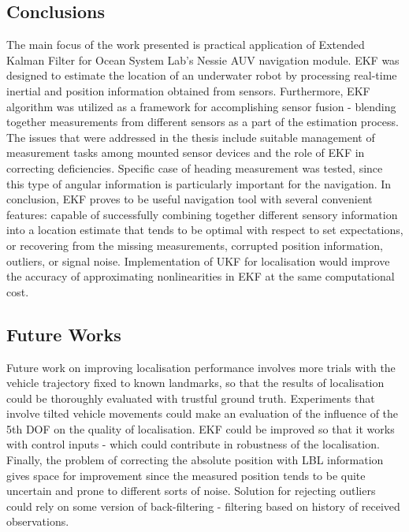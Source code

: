 \documentclass[a4paper, 10pt, conference]{ieeeconf}        %
\begin{document}
\subsection{Conclusions}
The main focus of the work presented is practical application of Extended Kalman Filter for Ocean System Lab's Nessie AUV navigation module. EKF was designed to estimate the location of an underwater robot by processing real-time inertial and position information obtained from sensors. Furthermore, EKF algorithm was utilized as a framework for accomplishing sensor fusion - blending together measurements from different sensors as a part of the estimation process. The issues that were addressed in the thesis include suitable management of measurement tasks among mounted sensor devices and the role of EKF in correcting deficiencies. Specific case of heading measurement was tested, since this type of angular information is particularly important for the navigation. In conclusion, EKF proves to be useful navigation tool with several convenient features: capable of successfully combining together different sensory information into a location estimate that tends to be optimal with respect to set expectations, or recovering from the missing measurements, corrupted position information, outliers, or signal noise. Implementation of UKF for localisation would improve the accuracy of approximating nonlinearities in EKF at the same computational cost.
\subsection{Future Works}
Future work on improving localisation performance involves more trials with the vehicle trajectory fixed to known landmarks, so that the results of localisation could be thoroughly evaluated with trustful ground truth. Experiments that involve tilted vehicle movements could make an evaluation of the influence of the 5th DOF on the quality of localisation. EKF could be improved so that it works with control inputs - which could contribute in robustness of the localisation. Finally, the problem of correcting the absolute position with LBL information gives space for improvement since the measured position tends to be quite uncertain and prone to different sorts of noise. Solution for rejecting outliers could rely on some version of back-filtering - filtering based on history of received observations.
\end{document}
